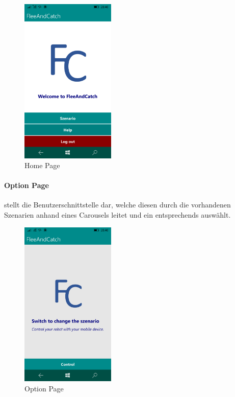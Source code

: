 \begin{figure}[h]
	\begin{center}
		\includegraphics[width=0.4\textwidth]{images/implementation/home.png}
	\end{center}	
	\caption{Home Page}
	\label{fig:home}
\end{figure}

\newpage
\paragraph{Option Page} stellt die Benutzerschnittstelle dar, welche diesen durch die vorhandenen Szenarien anhand eines Carousels leitet und ein entsprechends auswählt.

\begin{figure}[h]
	\begin{center}
		\includegraphics[width=0.4\textwidth]{images/implementation/option.png}
	\end{center}	
	\caption{Option Page}
	\label{fig:option}
\end{figure}

